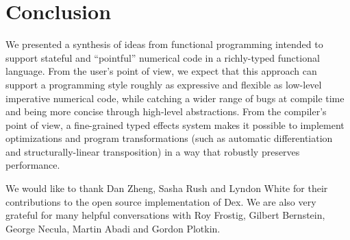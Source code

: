 \documentclass[acmsmall,screen,nonacm]{acmart}
\begin{document}




\section{Conclusion}
We presented a synthesis of ideas from functional programming intended to support stateful and ``pointful'' numerical code in a richly-typed functional language.
From the user's point of view, we expect that this approach can support a programming style roughly as expressive and flexible as low-level imperative numerical code, while catching a wider range of bugs at compile time and being more concise through high-level abstractions.
From the compiler's point of view, a fine-grained typed effects system makes it possible to implement optimizations and program transformations (such as automatic differentiation and structurally-linear transposition) in a way that robustly preserves performance.

\begin{acks}

We would like to thank Dan Zheng, Sasha Rush and Lyndon White for their contributions to the open source implementation of Dex.
We are also very grateful for many helpful conversations with Roy Frostig, Gilbert Bernstein, George Necula, Martin Abadi and Gordon Plotkin.

\end{acks}
\end{document}
